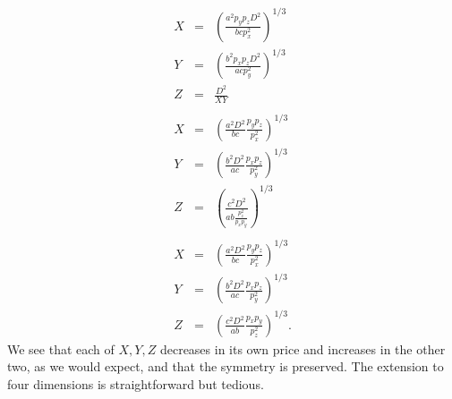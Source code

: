 \documentclass[12pt]{book}
\begin{document}
\begin{eqnarray*}
\\
X                        &=& \left(\frac{a^2p_yp_zD^2}{bcp_x^2}\right)^{1/3}  \\
Y                        &=& \left(\frac{b^2p_xp_zD^2}{acp_y^2}\right)^{1/3}  \\
Z                        &=& \frac{D^2}{XY}\\
\\
X                        &=& \left(\frac{a^2D^2}{bc}\frac{p_yp_z}{p_x^2}\right)^{1/3} \\
Y                        &=& \left(\frac{b^2D^2}{ac}\frac{p_xp_z}{p_y^2}\right)^{1/3} \\
Z                        &=& \left(\frac{c^2D^2}{ab\frac{p_z^2}{p_xp_y}}\right)^{1/3} \\
\\
X                        &=& \left(\frac{a^2D^2}{bc}\frac{p_yp_z}{p_x^2}\right)^{1/3}  \\
Y                        &=& \left(\frac{b^2D^2}{ac}\frac{p_xp_z}{p_y^2}\right)^{1/3}  \\
Z                        &=& \left(\frac{c^2D^2}{ab}\frac{p_xp_y}{p_z^2}\right)^{1/3}.
\end{eqnarray*}
We see that each of $X, Y, Z$ decreases in its own price and increases
in the other two, as we would expect, and that the symmetry is preserved.
The extension to four dimensions is straightforward but tedious.
\end{document}
